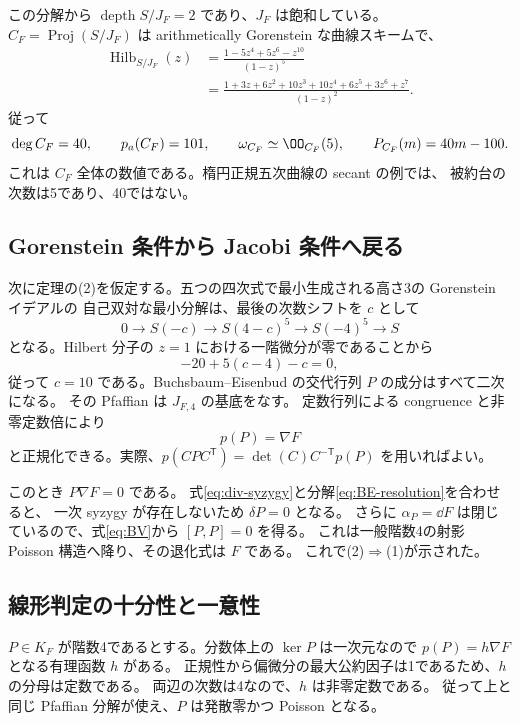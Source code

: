 この分解から $\operatorname{depth}S/J_F=2$ であり、$J_F$ は飽和している。
$C_F=\operatorname{Proj}(S/J_F)$ は arithmetically Gorenstein な曲線スキームで、
\begin{align*}
 \operatorname{Hilb}_{S/J_F}(z)
 &=\frac{1-5z^4+5z^6-z^{10}}{(1-z)^5}\\
 &=\frac{1+3z+6z^2+10z^3+10z^4+6z^5+3z^6+z^7}{(1-z)^2}.
\end{align*}
従って
\begin{equation}\label{eq:jacobian-invariants}
 \deg C_F=40,\qquad p_a(C_F)=101,\qquad
 \omega_{C_F}\simeq\OO_{C_F}(5),\qquad
 P_{C_F}(m)=40m-100.
\end{equation}
これは $C_F$ 全体の数値である。楕円正規五次曲線の secant の例では、
被約台の次数は5であり、40ではない。

\subsection{Gorenstein 条件から Jacobi 条件へ戻る}

次に定理の(2)を仮定する。五つの四次式で最小生成される高さ3の Gorenstein イデアルの
自己双対な最小分解は、最後の次数シフトを $c$ として
\[
 0\longrightarrow S(-c)\longrightarrow S(4-c)^5
 \longrightarrow S(-4)^5\longrightarrow S
\]
となる。Hilbert 分子の $z=1$ における一階微分が零であることから
\[
                         -20+5(c-4)-c=0,
\]
従って $c=10$ である。Buchsbaum--Eisenbud の交代行列 $P$ の成分はすべて二次になる。
その Pfaffian は $J_{F,4}$ の基底をなす。
定数行列による congruence と非零定数倍により
\[
                              p(P)=\nabla F
\]
と正規化できる。実際、$p(CPC^{\mathsf T})=\det(C)C^{-\mathsf T}p(P)$ を用いればよい。

このとき $P\nabla F=0$ である。
式\eqref{eq:div-syzygy}と分解\eqref{eq:BE-resolution}を合わせると、
一次 syzygy が存在しないため $\delta P=0$ となる。
さらに $\alpha_P=\dd F$ は閉じているので、式\eqref{eq:BV}から $[P,P]=0$ を得る。
これは一般階数4の射影 Poisson 構造へ降り、その退化式は $F$ である。
これで(2)$\Rightarrow$(1)が示された。

\subsection{線形判定の十分性と一意性}

$P\in K_F$ が階数4であるとする。分数体上の $\ker P$ は一次元なので
$p(P)=h\nabla F$ となる有理函数 $h$ がある。
正規性から偏微分の最大公約因子は1であるため、$h$ の分母は定数である。
両辺の次数は4なので、$h$ は非零定数である。
従って上と同じ Pfaffian 分解が使え、$P$ は発散零かつ Poisson となる。

